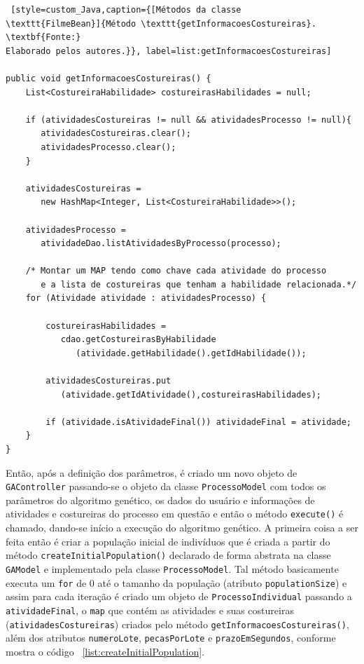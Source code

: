 \begin{lstlisting} [style=custom_Java,caption={[Métodos da classe
\texttt{FilmeBean}]{Método \texttt{getInformacoesCostureiras}. \textbf{Fonte:}
Elaborado pelos autores.}}, label=list:getInformacoesCostureiras]

public void getInformacoesCostureiras() {
	List<CostureiraHabilidade> costureirasHabilidades = null;
	
	if (atividadesCostureiras != null && atividadesProcesso != null){
	   atividadesCostureiras.clear();
	   atividadesProcesso.clear();
	}
	
	atividadesCostureiras = 
	   new HashMap<Integer, List<CostureiraHabilidade>>();
	
	atividadesProcesso = 
	   atividadeDao.listAtividadesByProcesso(processo);
	
	/* Montar um MAP tendo como chave cada atividade do processo 
	   e a lista de costureiras que tenham a habilidade relacionada.*/
	for (Atividade atividade : atividadesProcesso) {
		
		costureirasHabilidades = 
		   cdao.getCostureirasByHabilidade
		      (atividade.getHabilidade().getIdHabilidade());
		
		atividadesCostureiras.put
		   (atividade.getIdAtividade(),costureirasHabilidades);
		
		if (atividade.isAtividadeFinal()) atividadeFinal = atividade;
	}
}

\end{lstlisting}

\par Então, após a definição dos parâmetros, é criado um novo objeto de \texttt{GAController} passando-se o 
objeto da classe \texttt{ProcessoModel} com todos os parâmetros do algoritmo genético, os dados do usuário e 
informações de atividades e costureiras do processo em questão e então  o método \texttt{execute()} é chamado, dando-se início  
a execução do algoritmo genético. A primeira coisa a ser feita então é criar a população inicial de indivíduos que é criada a  partir do método \texttt{createInitialPopulation()} declarado de forma abstrata na classe \texttt{GAModel} e implementado pela classe 
\texttt{ProcessoModel}. Tal método basicamente executa um \texttt{for} de 0 até o tamanho da população (atributo 
\texttt{populationSize}) e assim para cada iteração é criado um objeto de \texttt{ProcessoIndividual} passando a 
\texttt{atividadeFinal}, o \texttt{map} que contém as atividades e suas costureiras (\texttt{atividadesCostureiras}) criados 
pelo método \texttt{getInformacoesCostureiras()}, além dos atributos \texttt{numeroLote}, \texttt{pecasPorLote} e
\texttt{prazoEmSegundos}, conforme mostra o código ~\ref{list:createInitialPopulation}.


